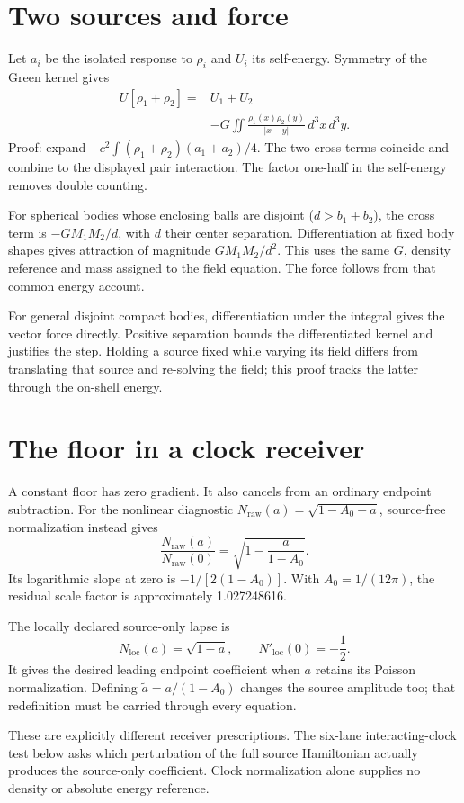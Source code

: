 \documentclass[10pt,twocolumn,letterpaper]{article}
\begin{document}
\section{Two sources and force}
Let $a_i$ be the isolated response to $\rho_i$ and $U_i$ its self-energy. Symmetry of the Green kernel gives
\[
\begin{aligned}
U[\rho_1+\rho_2]={}&U_1+U_2\\
&-G\iint\frac{\rho_1(x)\rho_2(y)}{|x-y|}\,d^3x\,d^3y.
\end{aligned}
\]
Proof: expand $-c^2\int(\rho_1+\rho_2)(a_1+a_2)/4$. The two cross terms coincide and combine to the displayed pair interaction. The factor one-half in the self-energy removes double counting.

For spherical bodies whose enclosing balls are disjoint ($d>b_1+b_2$), the cross term is $-GM_1M_2/d$, with $d$ their center separation. Differentiation at fixed body shapes gives attraction of magnitude $GM_1M_2/d^2$. This uses the same $G$, density reference and mass assigned to the field equation. The force follows from that common energy account.

For general disjoint compact bodies, differentiation under the integral gives the vector force directly. Positive separation bounds the differentiated kernel and justifies the step. Holding a source fixed while varying its field differs from translating that source and re-solving the field; this proof tracks the latter through the on-shell energy.

\section{The floor in a clock receiver}
A constant floor has zero gradient. It also cancels from an ordinary endpoint subtraction. For the nonlinear diagnostic $N_{\mathrm{raw}}(a)=\sqrt{1-A_0-a}$, source-free normalization instead gives
\[
\frac{N_{\mathrm{raw}}(a)}{N_{\mathrm{raw}}(0)}=\sqrt{1-\frac{a}{1-A_0}}.
\]
Its logarithmic slope at zero is $-1/[2(1-A_0)]$. With $A_0=1/(12\pi)$, the residual scale factor is approximately 1.027248616.

The locally declared source-only lapse is
\[
N_{\mathrm{loc}}(a)=\sqrt{1-a},\qquad N'_{\mathrm{loc}}(0)=-\frac12.
\]
It gives the desired leading endpoint coefficient when $a$ retains its Poisson normalization. Defining $\widetilde a=a/(1-A_0)$ changes the source amplitude too; that redefinition must be carried through every equation.

These are explicitly different receiver prescriptions. The six-lane interacting-clock test below asks which perturbation of the full source Hamiltonian actually produces the source-only coefficient. Clock normalization alone supplies no density or absolute energy reference.
\end{document}
